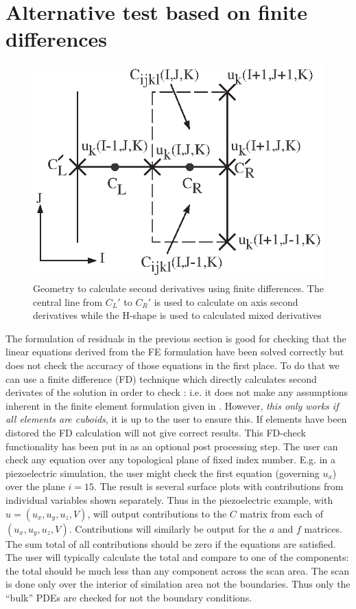 \documentclass[a4paper]{article}
\begin{document}
\section{Alternative test based on finite differences}

\begin{figure}
  \includegraphics{fdchk}
  \caption{Geometry to calculate second derivatives using finite
    differences. The central line from $C_L'$ to $C_R'$ is used to
    calculate on axis second derivatives while the H-shape is used to
    calculated mixed derivatives}
  \label{fdchk}
\end{figure}

The formulation of residuals in the previous section is good for
checking that the linear equations derived from the FE formulation
have been solved correctly but does not check the accuracy of those
equations in the first place. To do that we can use a finite
difference (FD) technique which directly calculates second derivates
of the solution in order to check : i.e. it does not make any
assumptions inherent in the finite element formulation given in
. However, \emph{this only works if all elements are
  cuboids}, it is up to the user to ensure this. If elements have been
distored the FD calculation will not give correct results. This FD-check
functionality has been put in  as an optional post processing
step. The user can check any equation over any topological plane of
fixed index number. E.g. in a piezoelectric simulation, the user might
check the first equation (governing $u_x$) over the plane $i=15$. The
result is several surface plots with contributions from individual
variables shown separately. Thus in the piezoelectric example, with
$u=(u_x,u_y,u_z,V)$,  will output contributions to the $C$
matrix from each of $(u_x,u_y,u_z,V)$. Contributions will similarly be
output for the $a$ and $f$ matrices. The sum total of all
contributions should be zero if the equations are satisfied. The user
will typically calculate the total and compare to one of the
components: the total should be much less than any component across
the scan area. The scan is done only over the interior of similation
area not the boundaries. Thus only the ``bulk'' PDEs are checked for
not the boundary conditions.
\end{document}
